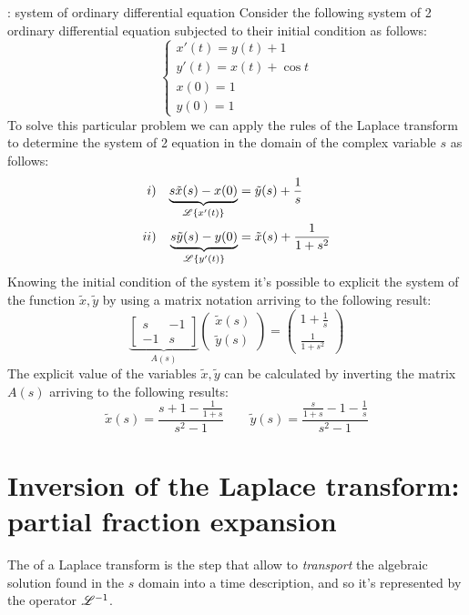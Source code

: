 	\begin{example}{: system of ordinary differential equation}
		Consider the following system of 2 ordinary differential equation subjected to their initial condition as follows:
		\[ \begin{cases}
			x'(t) = y(t) + 1 \\ y'(t) = x(t) + \cos t \\ x(0) = 1 \\ y(0) = 1
		\end{cases} \]
		To solve this particular problem we can apply the rules of the Laplace transform to determine the system of 2 equation in the domain of the complex variable $s$ as follows:
		\begin{align*}
			i)&&  \underbrace{s \tilde x(s) - x(0)}_{\mathscr{L} \left\{ x'(t) \right\}}&=\tilde y(s) + \frac 1 s \\
			ii)&&  \underbrace{s \tilde y(s) - y(0)}_{\mathscr{L} \left\{ y'(t) \right\}}&=\tilde x(s) + \frac 1 {1+s^2}
		\end{align*}
		Knowing the initial condition of the system it's possible to explicit the system of the function $\tilde x,\tilde y$ by using a matrix notation arriving to the following result:
		\[ \underbrace{\begin{bmatrix}
			s & -1 \\ -1 & s
		\end{bmatrix}}_{A(s)} \begin{pmatrix}
			\tilde x(s) \\ \tilde y(s)
		\end{pmatrix} = \begin{pmatrix}
			1 + \frac 1 s \\ \frac  1 {1+s^2}
		\end{pmatrix} \]
		The explicit value of the variables $\tilde x,\tilde y$ can be calculated by inverting the matrix $A(s)$ arriving to the following results:
		\[ \tilde x (s) = \frac{s+1 - \frac 1 {1+s}}{s^2-1} \qquad \tilde y(s) = \frac{\frac s {1+s} - 1  - \frac 1 s }{s^2-1} \]
		
	\end{example}

\section{Inversion of the Laplace transform: partial fraction expansion}
	
	The  of a Laplace transform is the step that allow to \textit{transport} the algebraic solution found in the $s$ domain into a time description, and so it's represented by the operator $\mathscr{L}^{-1}$.
	
